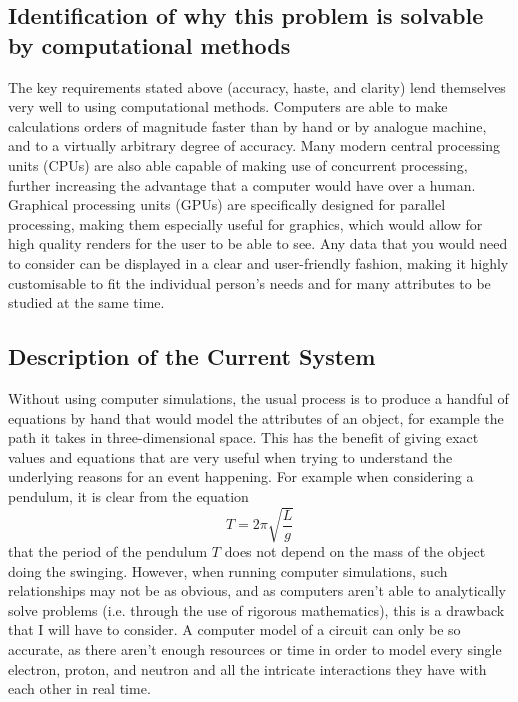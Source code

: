 \documentclass[11pt]{article}
\begin{document}
        \subsection{Identification of why this problem is solvable by computational methods}
            The key requirements stated above (accuracy, haste, and clarity) lend themselves very well to using computational methods. Computers are able to make calculations orders of magnitude faster than by hand or by analogue machine, and to a virtually arbitrary degree of accuracy. Many modern central processing units (CPUs) are also able capable of making use of concurrent processing, further increasing the advantage that a computer would have over a human. Graphical processing units (GPUs) are specifically designed for parallel processing, making them especially useful for graphics, which would allow for high quality renders for the user to be able to see. Any data that you would need to consider can be displayed in a clear and user-friendly fashion, making it highly customisable to fit the individual person's needs and for many attributes to be studied at the same time.

        \subsection{Description of the Current System}
            Without using computer simulations, the usual process is to produce a handful of equations by hand that would model the attributes of an object, for example the path it takes in three-dimensional space. This has the benefit of giving exact values and equations that are very useful when trying to understand the underlying reasons for an event happening. For example when considering a pendulum, it is clear from the equation $$ T = 2 \pi \sqrt{\frac{L}{g}} $$ that the period of the pendulum $T$ does not depend on the mass of the object doing the swinging. However, when running computer simulations, such relationships may not be as obvious, and as computers aren't able to analytically solve problems (i.e. through the use of rigorous mathematics), this is a drawback that I will have to consider. A computer model of a circuit can only be so accurate, as there aren't enough resources or time in order to model every single electron, proton, and neutron and all the intricate interactions they have with each other in real time.
            
\end{document}
